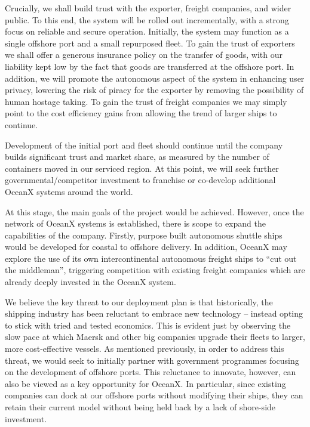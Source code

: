 Crucially, we shall build trust with the exporter, freight companies, and wider public. To this end, the system will be rolled out incrementally, with a strong focus on reliable and secure operation. Initially, the system may function as a single offshore port and a small repurposed fleet. To gain the trust of exporters we shall offer a generous insurance policy on the transfer of goods, with our liability kept low by the fact that goods are transferred at the offshore port. In addition, we will promote the autonomous aspect of the system in enhancing user privacy, lowering the risk of piracy for the exporter by removing the possibility of human hostage taking. To gain the trust of freight companies we may simply point to the cost efficiency gains from allowing the trend of larger ships to continue.

Development of the initial port and fleet should continue until the company builds significant trust and market share, as measured by the number of containers moved in our serviced region. At this point, we will seek further  governmental/competitor investment to franchise or co-develop additional OceanX systems around the world.

At this stage, the main goals of the project would be achieved. However, once the network of OceanX systems is established, there is scope to expand the capabilities of the company. Firstly, purpose built autonomous shuttle ships would be developed for coastal to offshore delivery. In addition, OceanX may explore the use of its own intercontinental autonomous freight ships to “cut out the middleman”, triggering competition with existing freight companies which are already deeply invested in the OceanX system.

We believe the key threat to our deployment plan is that historically, the shipping industry has been reluctant to embrace new technology -- instead opting to stick with tried and tested economics. This is evident just by observing the slow pace at which Maersk and other big companies upgrade their fleets to larger, more cost-effective vessels. As mentioned previously, in order to address this threat, we would seek to initially partner with government programmes focusing on the development of offshore ports. This reluctance to innovate, however, can also be viewed as a key opportunity for OceanX. In particular, since existing companies can dock at our offshore ports without modifying their ships, they can retain their current model without being held back by a lack of shore-side investment.


